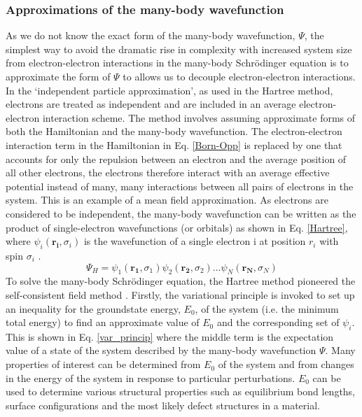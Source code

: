 \documentclass[11pt, twoside]{report}
\begin{document}
\subsubsection{Approximations of the many-body wavefunction}
As we do not know the exact form of the many-body wavefunction, $\Psi$, the simplest way to avoid the dramatic rise in complexity with increased system size from electron-electron interactions in the many-body Schr{\"o}dinger equation is to approximate the form of $\Psi$ to allows us to decouple electron-electron interactions. In the `independent particle approximation', as used in the Hartree method, electrons are treated as independent and are included in an average electron-electron interaction scheme. The method involves assuming approximate forms of both the Hamiltonian and the many-body wavefunction. The electron-electron interaction term in the Hamiltonian in Eq. \ref{Born-Opp} is replaced by one that accounts for only the repulsion between an electron and the average position of all other electrons, the electrons therefore interact with an average effective potential instead of many, many interactions between all pairs of electrons in the system. This is an example of a mean field approximation.
As electrons are considered to be independent, the many-body wavefunction can be written as the product of single-electron wavefunctions (or orbitals) as shown in Eq. \ref{Hartree}, where $\psi_i(\mathbf{r_i}, \sigma_i)$ is the wavefunction of a single electron i at position $r_i$ with spin $\sigma_i$ \cite{Prasad_ch2}. 
\begin{equation}\label{Hartree}
\Psi_H = \psi_1(\mathbf{r_1}, \sigma_1) \psi_2(\mathbf{r_2}, \sigma_2) ... \psi_N(\mathbf{r_N}, \sigma_N)
\end{equation}
To solve the many-body Schr{\"o}dinger equation, the Hartree method pioneered the self-consistent field method \cite{RichardMartin_Ch1}. Firstly, the variational principle is invoked to set up an inequality for the groundstate energy, $E_0$, of the system (i.e. the minimum total energy) to find an approximate value of $E_0$ and the corresponding set of $\psi_i$. This is shown in Eq. \ref{var_princip} where the middle term is the expectation value of a state of the system described by the many-body wavefunction $\Psi$. Many properties of interest can be determined from $E_0$ of the system and from changes in the energy of the system in response to particular perturbations. $E_0$ can be used to determine various structural properties such as equilibrium bond lengths, surface configurations and the most likely defect structures in a material.
\end{document}
